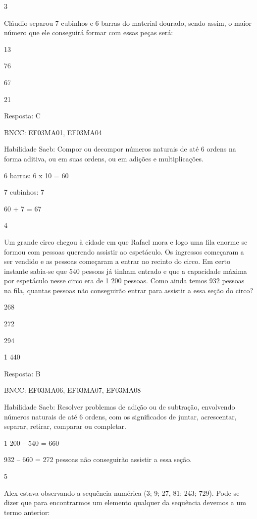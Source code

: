 \begin{escolha}
\begin{escolha}
\num{3}

Cláudio separou 7 cubinhos e 6 barras do material dourado, sendo assim,
o maior número que ele conseguirá formar com essas peças será:

\begin{escolha}
\item
  13
\item
  76
\item
  67
\item
  21
\end{escolha}

Resposta: C

BNCC: EF03MA01, EF03MA04

Habilidade Saeb: Compor ou decompor números naturais de até 6 ordens na
forma aditiva, ou em suas ordens, ou em adições e multiplicações.

6 barras: 6 x 10 = 60

7 cubinhos: 7

60 + 7 = 67

\num{4}

Um grande circo chegou à cidade em que Rafael mora e logo uma fila
enorme se formou com pessoas querendo assistir ao espetáculo. Os
ingressos começaram a ser vendido e as pessoas começaram a entrar no
recinto do circo. Em certo instante sabia-se que 540 pessoas já tinham
entrado e que a capacidade máxima por espetáculo nesse circo era de 1
200 pessoas. Como ainda temos 932 pessoas na fila, quantas pessoas não
conseguirão entrar para assistir a essa seção do circo?

\begin{escolha}
\item
  268
\item
  272
\item
  294
\item
  1 440
\end{escolha}

Resposta: B

BNCC: EF03MA06, EF03MA07, EF03MA08

Habilidade Saeb: Resolver problemas de adição ou de subtração,
envolvendo números naturais de até 6 ordens, com os significados de
juntar, acrescentar, separar, retirar, comparar ou completar.

1 200 -- 540 = 660

932 -- 660 = 272 pessoas não conseguirão assistir a essa seção.

\num{5}

Alex estava observando a sequência numérica (3; 9; 27, 81; 243; 729).
Pode-se dizer que para encontrarmos um elemento qualquer da sequência
devemos a um termo anterior:


\end{escolha}
\end{escolha}
